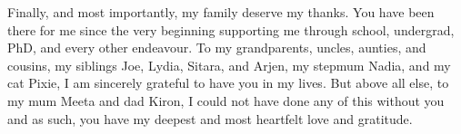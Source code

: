 \begin{SingleSpace}
Finally, and most importantly, my family deserve my thanks. You have been there for me since the very beginning supporting me through school, undergrad, PhD, and every other endeavour. To my grandparents, uncles, aunties, and cousins, my siblings Joe, Lydia, Sitara, and Arjen, my stepmum Nadia, and my cat Pixie, I am sincerely grateful to have you in my lives. But above all else, to my mum Meeta and dad Kiron, I could not have done any of this without you and as such, you have my deepest and most heartfelt love and gratitude.

\end{SingleSpace}
\clearpage
